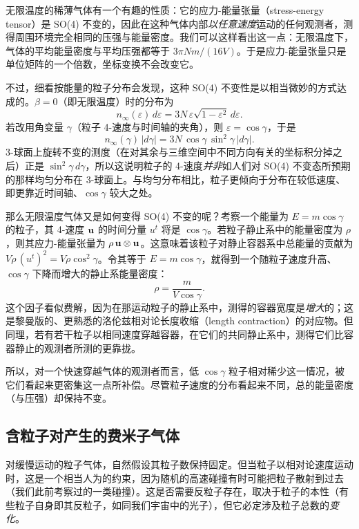 无限温度的稀薄气体有一个有趣的性质：它的应力-能量张量（stress-energy tensor）是 SO(4) 不变的，因此在这种气体内部\emph{以任意速度}运动的任何观测者，测得周围环境完全相同的压强与能量密度。我们可以这样看出这一点：无限温度下，气体的平均能量密度与平均压强都等于 $3\pi Nm/(16V)$。于是应力-能量张量只是单位矩阵的一个倍数，坐标变换不会改变它。

不过，细看按能量的粒子分布会发现，这种 SO(4) 不变性是以相当微妙的方式达成的。$\beta=0$（即无限温度）时的分布为
\begin{equation}
n_{\infty}(\varepsilon)\,d\varepsilon=3N\,\varepsilon\sqrt{1-\varepsilon^{2}}\,d\varepsilon .
\end{equation}
若改用角变量 $\gamma$（粒子 4-速度与时间轴的夹角），则 $\varepsilon=\cos\gamma$，于是
\begin{equation}
n_{\infty}(\gamma)\,|d\gamma|=3N\,\cos\gamma\,\sin^{2}\gamma\,|d\gamma| .
\end{equation}
3-球面上旋转不变的测度（在对其余与三维空间中不同方向有关的坐标积分掉之后）正是 $\sin^{2}\gamma\,d\gamma$，所以这说明粒子的 4-速度\emph{并非}如人们对 SO(4) 不变态所预期的那样均匀分布在 3-球面上。与均匀分布相比，粒子更倾向于分布在较低速度、即更靠近时间轴、$\cos\gamma$ 较大之处。

那么无限温度气体又是如何变得 SO(4) 不变的呢？考察一个能量为 $E=m\cos\gamma$ 的粒子，其 4-速度 $\mathbf{u}$ 的时间分量 $u^{t}$ 将是 $\cos\gamma$。若粒子静止系中的能量密度为 $\rho$，则其应力-能量张量为 $\rho\,\mathbf{u}\otimes\mathbf{u}$。这意味着该粒子对静止容器系中总能量的贡献为 $V\rho\,(u^{t})^{2}=V\rho\cos^{2}\gamma$。令其等于 $E=m\cos\gamma$，就得到一个随粒子速度升高、$\cos\gamma$ 下降而增大的静止系能量密度：
\begin{equation}
\rho=\frac{m}{V\cos\gamma}.
\end{equation}
这个因子看似费解，因为在那运动粒子的静止系中，测得的容器宽度是\emph{增大}的；这是黎曼版的、更熟悉的洛伦兹相对论长度收缩（length contraction）的对应物。但同理，若有若干粒子以相同速度穿越容器，在它们的共同静止系中，测得它们比容器静止的观测者所测的更靠拢。

所以，对一个快速穿越气体的观测者而言，低 $\cos\gamma$ 粒子相对稀少这一情况，被它们看起来更密集这一点所补偿。尽管粒子速度的分布看起来不同，总的能量密度（与压强）却保持不变。

\subsection{含粒子对产生的费米子气体}

对缓慢运动的粒子气体，自然假设其粒子数保持固定。但当粒子以相对论速度运动时，这是一个相当人为的约束，因为随机的高速碰撞有时可能把粒子散射到过去（我们此前考察过的一类碰撞）。这是否需要反粒子存在，取决于粒子的本性（有些粒子自身即其反粒子，如同我们宇宙中的光子），但它必定涉及粒子总数的\emph{变化}。

